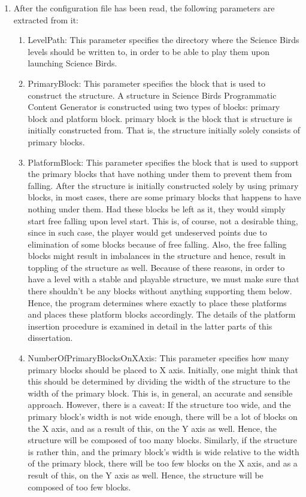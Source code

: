 \documentclass[12pt]{dalthesis}
\begin{document}
\begin{enumerate}
  \item After the configuration file has been read, the following parameters are extracted from it:

  \begin{enumerate}
    \item LevelPath: This parameter specifies the directory where the Science Birds levels should be written to, in order to be able to play them upon launching Science Birds.

    \item PrimaryBlock: This parameter specifies the block that is used to construct the structure. A structure in Science Birds Programmatic Content Generator is constructed using two types of blocks: primary block and platform block. primary block is the block that is structure is initially constructed from. That is, the structure initially solely consists of primary blocks.

    \item PlatformBlock: This parameter specifies the block that is used to support the primary blocks that have nothing under them to prevent them from falling. After the structure is initially constructed solely by using primary blocks, in most cases, there are some primary blocks that happens to have nothing under them. Had these blocks be left as it, they would simply start free falling upon level start. This is, of course, not a desirable thing, since in such case, the player would get undeserved points due to elimination of some blocks because of free falling. Also, the free falling blocks might result in imbalances in the structure and hence, result in toppling of the structure as well. Because of these reasons, in order to have a level with a stable and playable structure, we must make sure that there shouldn't be any blocks without anything supporting them below. Hence, the program determines where exactly to place these platforms and places these platform blocks accordingly. The details of the platform insertion procedure is examined in detail in the latter parts of this dissertation.

    \item NumberOfPrimaryBlocksOnXAxis: This parameter specifies how many primary blocks should be placed to X axis. Initially, one might think that this should be determined by dividing the width of the structure to the width of the primary block. This is, in general, an accurate and sensible approach. However, there is a caveat: If the structure too wide, and the primary block's width is not wide enough, there will be a lot of blocks on the X axis, and as a result of this, on the Y axis as well. Hence, the structure will be composed of too many blocks. Similarly, if the structure is rather thin, and the primary block's width is wide relative to the width of the primary block, there will be too few blocks on the X axis, and as a result of this, on the Y axis as well. Hence, the structure will be composed of too few blocks.
  \end{enumerate}


\end{enumerate}
\end{document}

